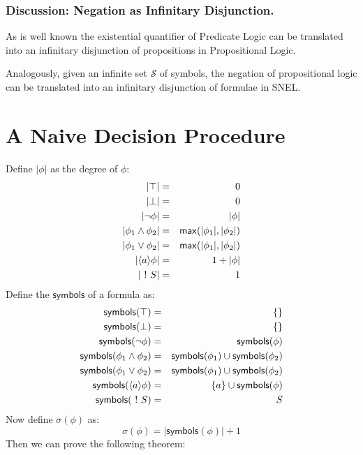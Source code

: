 \subsubsection{Discussion: Negation as Infinitary Disjunction. }
As is well known the existential quantifier of Predicate Logic can be translated into an infinitary disjunction of propositions in Propositional Logic.

Analogously, given an infinite set $\mathcal{S}$ of symbols, the negation of propositional logic can be translated into an infinitary disjunction of formulae in SNEL.



\section{A Naive Decision Procedure}
Define $|\phi|$ as the degree of $\phi$:
\begin{eqnarray*}
|\top| & = & 0  \\
|\bot| & = & 0  \\
|\neg \phi| & = & | \phi |  \\
|\phi_1 \land \phi_2| & = & \mathsf{max}(| \phi_1 |, | \phi_2|)  \\
|\phi_1 \lor \phi_2| & = & \mathsf{max}(| \phi_1 |, | \phi_2|)  \\
|\langle a \rangle \phi | & = & 1 + | \phi |  \\
| \ ! \  S | & = & 1 
\end{eqnarray*}
Define the $\mathsf{symbols}$ of a formula as:
\begin{eqnarray*}
\mathsf{symbols}(\top) & = & \{\}  \\
\mathsf{symbols}(\bot) & = & \{\}  \\
\mathsf{symbols}(\neg \phi) & = & \mathsf{symbols}(\phi)  \\
\mathsf{symbols}(\phi_1 \land \phi_2) & = &\mathsf{symbols}(\phi_1) \cup \mathsf{symbols}(\phi_2)  \\
\mathsf{symbols}(\phi_1 \lor \phi_2) & = &\mathsf{symbols}(\phi_1) \cup \mathsf{symbols}(\phi_2)  \\
\mathsf{symbols}(\langle a \rangle \phi) & = & \{a\} \cup \mathsf{symbols}(\phi)  \\
\mathsf{symbols}(\ ! \  S) & = & S 
\end{eqnarray*}
Now define $\sigma(\phi)$ as:
\[
\sigma(\phi) = |\mathsf{symbols}(\phi)| + 1
\]
Then we can prove the following theorem:

